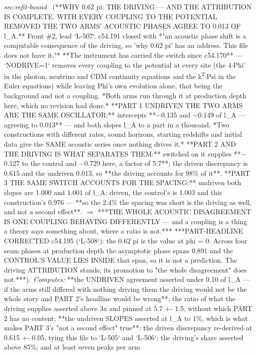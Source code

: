 \begin{description}
\textit{sec:refit-bound} \ (**WHY 0.62 pi: THE DRIVING --- AND THE ATTRIBUTION IS COMPLETE. WITH EVERY COUPLING TO THE POTENTIAL REMOVED THE TWO ARMS' ACOUSTIC PHASES AGREE TO 0.013 OF l\_A.** Front \#2, lead `L-507`. c54.191 closed with *"an acoustic phase shift is a computable consequence of the driving, so 'why 0.62 pi' has an address. This file does not have it."* **The instrument has carried the switch since c54.170** --- `NODRIVE=1` removes every coupling to the potential at every site (the 4\ensuremath{\cdot}Phi' in the photon, neutrino and CDM continuity equations and the k\textsuperscript{2}\ensuremath{\cdot}Psi in the Euler equations) while leaving Phi's own evolution alone, that being the background and not a coupling. *Both arms run through it at production depth here, which no revision had done.* **PART 1 UNDRIVEN THE TWO ARMS ARE THE SAME OSCILLATOR:** intercepts **\ensuremath{-}0.135 and \ensuremath{-}0.149 of l\_A --- agreeing to 0.013** --- and both slopes l\_A to a part in a thousand. *Two constructions with different rates, sound horizons, starting redshifts and initial data give the SAME acoustic series once nothing drives it.* **PART 2 AND THE DRIVING IS WHAT SEPARATES THEM:** switched on it supplies **\ensuremath{-}0.127 to the control and \ensuremath{-}0.729 here, a factor of 5.7**; the driven discrepancy is 0.615 and the undriven 0.013, so **the driving accounts for 98\% of it**. **PART 3 THE SAME SWITCH ACCOUNTS FOR THE SPACING:** undriven both slopes are 1.000 and 1.001 of l\_A; driven, the control's is 1.003 and this construction's 0.976 --- **so the 2.4\% the spacing was short is the driving as well, and not a second effect**. \ensuremath{\Rightarrow} ***THE WHOLE ACOUSTIC DISAGREEMENT IS ONE COUPLING BEHAVING DIFFERENTLY --- and a coupling is a thing a theory says something about, where a ratio is not.***  ***PART-HEADLINE CORRECTED c54.195 (`L-508`): the 0.62 pi is the value at phi = 0. Across four seam phases at production depth the asymptotic phase spans 0.891 and the CONTROL'S VALUE LIES INSIDE that span, so it is not a prediction. The driving ATTRIBUTION stands; its promotion to "the whole disagreement" does not.***). 
\emph{Computes:} **the UNDRIVEN agreement asserted under 0.10 of l\_A --- if the arms still differed with nothing driving them the driving would not be the whole story and PART 2's headline would be wrong**; the ratio of what the driving supplies asserted above 3x and pinned at 5.7 +- 1.5, without which PART 2 has no content; **the undriven SLOPES asserted at l\_A to 1\%, which is what makes PART 3's "not a second effect" true**; the driven discrepancy re-derived at 0.615 +- 0.05, tying this file to `L-505` and `L-506`; the driving's share asserted above 85\%; and at least seven peaks per arm

\end{description}
